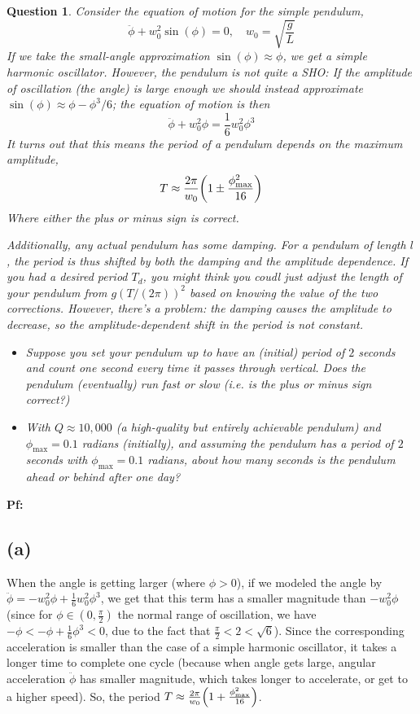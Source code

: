 \documentclass{article}
\newtheorem{question}{Question}
\DeclarePairedDelimiter{\paran}{(}{)}%
\begin{document}
\section{}
\begin{question}\label{q6}
    Consider the equation of motion for the simple pendulum,
    $$\ddot \phi+w_0^2\sin(\phi)=0,\quad w_0=\sqrt{\frac{g}{L}}$$
    If we take the small-angle approximation $\sin(\phi)\approx\phi$, we get a simple harmonic oscillator. However, the pendulum is not quite a SHO: If the amplitude of oscillation (the angle) is large enough we should instead approximate $\sin(\phi)\approx \phi-\phi^3/6$; the equation of motion is then 
    $$\ddot\phi+w_0^2\phi=\frac{1}{6}w_0^2\phi^3$$
    It turns out that this means the period of a pendulum depends on the maximum amplitude,
    $$T\approx\frac{2\pi}{w_0}\paran*{1\pm\frac{\phi^2_{\max}}{16}}$$
    Where either the plus or minus sign is correct.
    
    Additionally, any actual pendulum has some damping. For a pendulum of length $l$, the period is thus shifted by both the damping and the amplitude dependence. If you had a desired period $T_d$, you might think you coudl just adjust the length of your pendulum from $g(T/(2\pi))^2$ based on knowing the value of the two corrections. However, there's a problem: the damping causes the amplitude to decrease, so the amplitude-dependent shift in the period is not constant.
    \begin{itemize}
        \item[(a)] Suppose you set your pendulum up to have an (initial) period of $2$ seconds and count one second every time it passes through vertical. Does the pendulum (eventually) run fast or slow (i.e. is the plus or minus sign correct?) 
        \item[(b)] With $Q\approx 10,000$ (a high-quality but entirely achievable pendulum) and $\phi_{\max}=0.1$ radians (initially), and assuming the pendulum has a period of $2$ seconds with $\phi_{\max}=0.1$ radians, about how many seconds is the pendulum ahead or behind after one day? 
    \end{itemize}
\end{question}

\textbf{Pf:}
\subsection*{(a)}
When the angle is getting larger (where $\phi>0$), if we modeled the angle by $\ddot\phi=-w_0^2\phi+\frac{1}{6}w_0^2\phi^3$, we get that this term has a smaller magnitude than $-w_0^2\phi$ (since for $\phi \in (0,\frac{\pi}{2})$ the normal range of oscillation, we have $-\phi<-\phi+\frac{1}{6}\phi^3<0$, due to the fact that $\frac{\pi}{2}<2<\sqrt{6}$). Since the corresponding acceleration is smaller than the case of a simple harmonic oscillator, it takes a longer time to complete one cycle (because when angle gets large, angular acceleration $\ddot \phi$ has smaller magnitude, which takes longer to accelerate, or get to a higher speed). So, the period $T\approx \frac{2\pi}{w_0}\paran*{1+\frac{\phi^2_{\max}}{16}}$.
\end{document}
